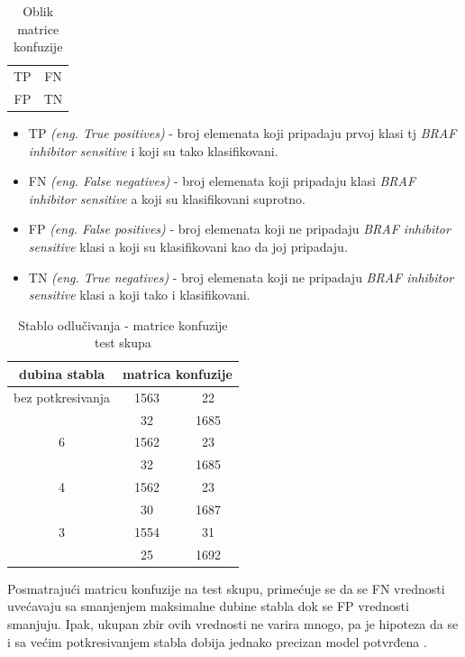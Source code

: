 \documentclass[a4paper]{article}
\begin{document}
\begin{table}[h!]
\centering
\begin{tabular}{|c c|}
  \hline
  TP & FN \\
  FP & TN  \\
 \hline
\end{tabular}
\caption{Oblik matrice konfuzije}
\label{table:0}
\end{table}

\begin{itemize}
  \item TP \textit{(eng. True positives)} - broj elemenata koji pripadaju prvoj klasi  tj \textit{BRAF inhibitor sensitive} i koji su tako klasifikovani.
  \item FN \textit{(eng. False negatives)} - broj elemenata koji pripadaju klasi \textit{BRAF inhibitor sensitive} a koji su klasifikovani suprotno.
  \item FP \textit{(eng. False positives)} - broj elemenata koji ne pripadaju \textit{BRAF inhibitor sensitive} klasi a koji su klasifikovani kao da joj pripadaju.
  \item TN \textit{(eng. True negatives)} - broj elemenata koji ne pripadaju \textit{BRAF inhibitor sensitive} klasi a koji tako i klasifikovani.
\end{itemize}

\begin{table}[h!]
\centering
\begin{tabular}{|c c c|} 
  \hline
  dubina stabla & \multicolumn{2}{c|}{matrica konfuzije} \\ [0.5ex] 
  \hline
  bez potkresivanja & 1563 & 22 \\
     & 32 & 1685  \\
  \hline
  6 & 1562 & 23 \\
     & 32 & 1685  \\
  \hline
  4 & 1562 & 23 \\
     & 30 & 1687  \\
  \hline
  3 & 1554 & 31 \\
     & 25 & 1692  \\
 [1ex] 
 \hline
\end{tabular}
\caption{Stablo odlučivanja - matrice konfuzije test skupa}
\label{table:5}
\end{table}

Posmatrajući matricu konfuzije na test skupu, primećuje se da se FN vrednosti uvećavaju sa smanjenjem maksimalne dubine stabla dok se FP vrednosti smanjuju. Ipak, ukupan zbir ovih vrednosti ne varira mnogo, pa je hipoteza da se i sa većim potkresivanjem stabla dobija jednako precizan model potvrđena \cite{classification}.
\end{document}

